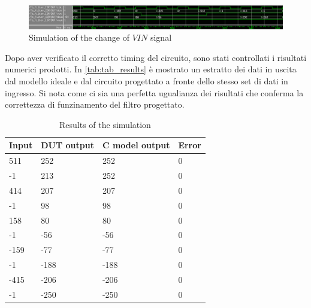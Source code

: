 \begin{figure}[h]
	\center
	\includegraphics[width=1\textwidth]{images/wave_vin_0_1.png}
	\caption{Simulation of the change of $VIN$ signal}
	\label{fig:wave_vin}
\end{figure}

Dopo aver verificato il corretto timing del circuito, sono stati controllati i risultati numerici prodotti. In \autoref{tab:tab_results} è mostrato un estratto dei dati in uscita dal modello ideale e dal circuito progettato a fronte dello stesso set di dati in ingresso. Si nota come ci sia una perfetta ugualianza dei risultati che conferma la correttezza di funzinamento del filtro progettato.

\begin{table}[h]
\begin{center}
\begin{tabular}{|l|l|l|l|}
\hline
Input & DUT output & C model output & Error \\
\hline
511 & 252 & 252 & 0 \\
-1 & 213 & 252 & 0 \\
414 & 207 & 207 & 0 \\
-1 & 98 & 98 & 0 \\
158 & 80 & 80 & 0 \\
-1 & -56 & -56 & 0 \\
-159 & -77 & -77 & 0 \\
-1 & -188 & -188 & 0 \\
-415 & -206 & -206 & 0 \\
-1 & -250 & -250 & 0 \\
\hline
\end{tabular}
\end{center}
\caption{Results of the simulation}
\label{tab:tab_results}
\end{table}


